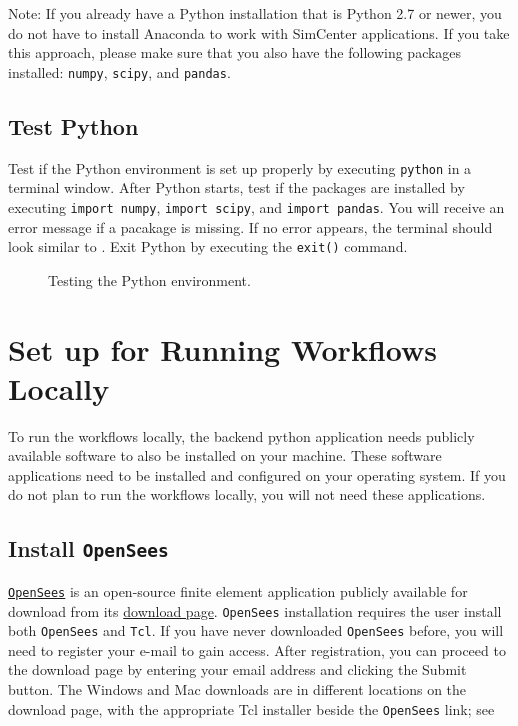 Note: If you already have a Python installation that is Python 2.7 or
newer, you do not have to install Anaconda to work with SimCenter
applications.
If you take this approach, please make sure that you also have the following packages installed: 
\texttt{numpy}, \texttt{scipy}, and \texttt{pandas}.

\subsection{Test Python}

Test if the Python environment is set up properly by
executing \texttt{python} in a terminal window. After Python starts,
test if the packages are installed by executing \texttt{import
numpy}, \texttt{import scipy}, and \texttt{import pandas}. You will
receive an error message if a pacakage is missing. If no error
appears, the terminal should look similar
to . Exit Python by executing
the \texttt{exit()} command.

\begin{figure}[!htbp]
  \caption{Testing the Python environment.}
  \label{fig:python_test}
\end{figure}

\section{Set up for Running Workflows Locally}\label{setup}

To run the workflows locally, the backend python application needs
publicly available software to also be installed on your
machine. These software applications need to be installed and
configured on your operating system. If you do not plan to run the
workflows locally, you will not need these applications.

\subsection{Install \texttt{OpenSees}}

\href{http://opensees.berkeley.edu}{\texttt{OpenSees}} is an open-source finite element application publicly available for download from its \href{http://opensees.berkeley.edu/OpenSees/user/download.php}{download page}. \texttt{OpenSees} installation requires the user install both \texttt{OpenSees} and \texttt{Tcl}.  If you have never downloaded \texttt{OpenSees} before, you will need to register your e-mail to gain access. After registration, you can proceed to the download page by entering your email address and clicking the Submit button. The Windows and Mac downloads are in different locations on the download page, with the appropriate Tcl installer beside the \texttt{OpenSees} link; see 


